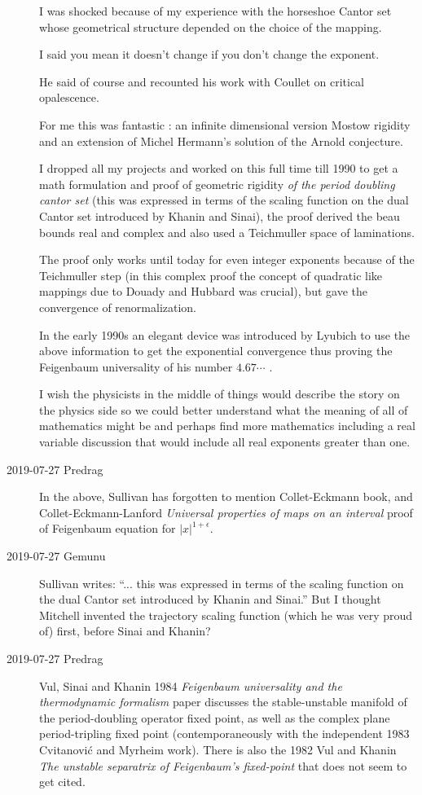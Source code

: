 \begin{description}
I was shocked because of my experience with the horseshoe Cantor set
whose geometrical structure depended on the choice of the mapping.

I said you mean it doesn't change if you don't change the exponent.

He said of course and recounted his work with Coullet on critical
opalescence.

For me this was fantastic :
an infinite dimensional version Mostow rigidity and an extension of
Michel Hermann's solution of the Arnold conjecture.

I dropped all my projects and worked on this full time till 1990 to get a
math formulation and proof of geometric  rigidity \emph{of the period
doubling cantor set} (this was expressed in terms of the scaling function
on the dual Cantor set introduced by Khanin and Sinai), the
proof derived the beau bounds real and complex and also used a
Teichmuller space of laminations.

The proof only works until today for even integer exponents because of
the Teichmuller step (in this complex proof the concept of quadratic like
mappings due to Douady and Hubbard was crucial), but gave the convergence
of renormalization.

In the early 1990s an elegant device was introduced by Lyubich to use the
above information to get the exponential convergence thus proving the
Feigenbaum universality of his number $4.67\cdots$ .

I wish the physicists in the middle of things would describe the story on
the physics side so we could better understand what the meaning of all of
mathematics might be and perhaps find more mathematics including a real
variable discussion that would include all real exponents greater than
one.

\item[2019-07-27 Predrag]
In the above, Sullivan has forgotten to mention Collet-Eckmann
book, and Collet-Eckmann-Lanford {\em
Universal properties of maps on an interval} proof of Feigenbaum
equation for $|x|^{1+\epsilon}$.

\item[2019-07-27 Gemunu]
Sullivan writes: ``... this was expressed in terms of the scaling
function on the dual Cantor set introduced by Khanin and Sinai.'' But I
thought Mitchell invented the trajectory scaling function (which he was
very proud of) first, before Sinai and Khanin?

\item[2019-07-27 Predrag]
Vul, Sinai and Khanin 1984 {\em Feigenbaum universality and
the thermodynamic formalism} paper discusses the stable-unstable manifold
of the period-doubling operator fixed point, as well as the complex plane
period-tripling fixed point (contemporaneously with the independent 1983
Cvitanovi{\'c} and Myrheim work). There is also the
1982 Vul and Khanin {\em The unstable separatrix of
{Feigenbaum}'s fixed-point} that does not seem to get cited.


\end{description}
